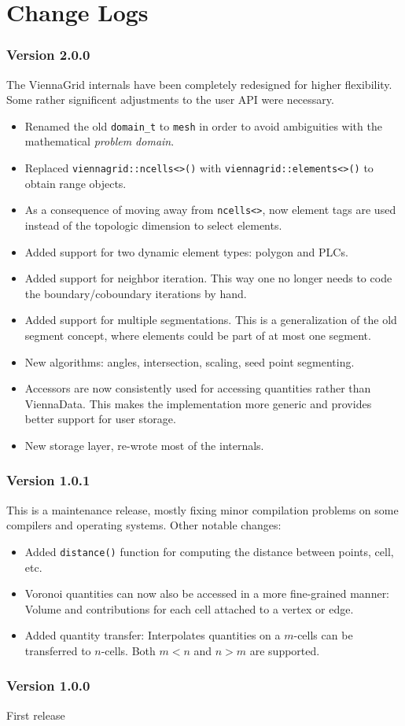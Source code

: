 
\chapter{Change Logs}

\subsection*{Version 2.0.0}
The ViennaGrid internals have been completely redesigned for higher flexibility.
Some rather significent adjustments to the user API were necessary.
\begin{itemize}
 \item Renamed the old \lstinline|domain_t| to \lstinline|mesh| in order to avoid ambiguities with the mathematical \emph{problem domain}.
 \item Replaced \lstinline|viennagrid::ncells<>()| with \lstinline|viennagrid::elements<>()| to obtain range objects.
 \item As a consequence of moving away from \lstinline|ncells<>|, now element tags are used instead of the topologic dimension to select elements.
 \item Added support for two dynamic element types: polygon and PLCs.
 \item Added support for neighbor iteration. This way one no longer needs to code the boundary/coboundary iterations by hand.
 \item Added support for multiple segmentations. This is a generalization of the old segment concept, where elements could be part of at most one segment.
 \item New algorithms: angles, intersection, scaling, seed point segmenting.
 \item Accessors are now consistently used for accessing quantities rather than ViennaData. This makes the implementation more generic and provides better support for user storage.
 \item New storage layer, re-wrote most of the internals.
\end{itemize}

\subsection*{Version 1.0.1}
This is a maintenance release, mostly fixing minor compilation problems on some compilers and operating systems. Other notable changes:
\begin{itemize}
  \item Added \lstinline|distance()| function for computing the distance between points, cell, etc.
  \item Voronoi quantities can now also be accessed in a more fine-grained manner: Volume and contributions for each cell attached to a vertex or edge.
  \item Added quantity transfer: Interpolates quantities on a $m$-cells can be transferred to $n$-cells. Both $m<n$ and $n>m$ are supported.
\end{itemize}

\subsection*{Version 1.0.0}
First release
